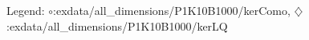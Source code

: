 Legend: {\color{NavyBlue}$\circ$}:exdata/all\_dimensions/P1K10B1000/kerComo, {\color{Magenta}$\diamondsuit$}:exdata/all\_dimensions/P1K10B1000/kerLQ